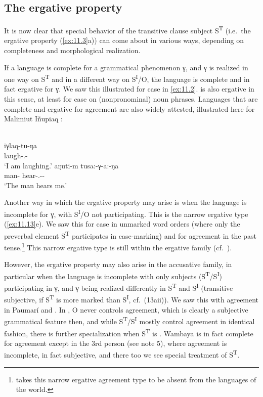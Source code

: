 \documentclass[output=paper]{langsci/langscibook}
\begin{document}
\subsection{The ergative property}\label{sec:11.5.1}

It is now clear that special behavior of the transitive clause subject
S\textsuperscript{T} (i.e.\ the ergative property (\ref{ex:11.3}a)) can come about in
various ways, depending on completeness and morphological realization.

If a language is complete for a grammatical phenomenon γ, and γ is realized in
one way on S\textsuperscript{T} and in a different way on
S\textsuperscript{I}/O, the language is complete and in fact ergative for γ. We
saw this illustrated for case in  \eqref{ex:11.2}.  is also ergative
in this sense, at least for case on (nonpronominal) noun phrases. Languages
that are complete and ergative for agreement are also widely attested,
illustrated here for Malimiut Iñupiaq \citep{Lanz2010}:

\ea%
    \label{ex:11.15} {\parencite[188]{Lanz2010}}\\
	\ea
		\gll iγlaq-tu-ŋa\\
			laugh-\Intr.\Ind-\Fsg{}\\
		\glt ‘I am laughing.’
	\ex
		\gll aŋuti-m  tusa:-γ-a:-ŋa\\
			man-\Erg{}  hear-\Tr.\Ind{}-\Tsg{}-\Fsg{}\\
		\glt ‘The man hears me.’
	\z
\z

Another way in which the ergative property may arise is when the language is
incomplete for γ, with S\textsuperscript{I}/O not participating. This is the
narrow ergative type (\ref{ex:11.13}e). We saw this for case in  unmarked word
orders (where only the preverbal element S\textsuperscript{T} participates in
case-marking) and for agreement in the  past
tense.\footnote{\citet[305]{Bobaljik2008} takes this narrow ergative agreement
type to be absent from the languages of the world.} This narrow ergative type
is still within the ergative family (cf.\ ).

However, the ergative property may also arise in the accusative family, in
particular when the language is incomplete with only subjects
(S\textsuperscript{T}/S\textsuperscript{I}) participating in γ, and γ being
realized differently in S\textsuperscript{T} and S\textsuperscript{I}
(transitive subjective, if S\textsuperscript{T} is more marked than
S\textsuperscript{I}, cf.\ (13aii)). We saw this with \Tsg{} agreement in
Paumarí and . In , O never controls agreement, which is clearly a
subjective grammatical feature then, and while
S\textsuperscript{T}/S\textsuperscript{I} mostly control agreement in identical
fashion, there is further specialization when S\textsuperscript{T} is \Tsg{}.
Wambaya is in fact complete for agreement except in the 3rd person (see note
5), where agreement is incomplete, in fact subjective, and there too we see
special treatment of S\textsuperscript{T}.
\end{document}
